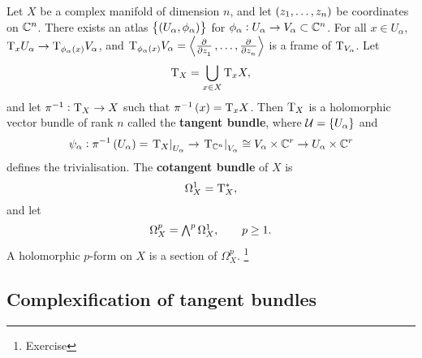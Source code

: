 \pagebreak

\begin{example}
Let $ X $ be a complex manifold of dimension $ n $, and let $ \br{z_1, \dots, z_n} $ be coordinates on $ \mathbb{C}^n $. There exists an atlas $ \cbr{\br{U_\alpha, \phi_\alpha}} $ for $ \phi_\alpha : U_\alpha \to V_\alpha \subset \mathbb{C}^n $. For all $ x \in U_\alpha $, $ \T_xU_\alpha \to \T_{\phi_\alpha\br{x}}V_\alpha $, and $ \T_{\phi_\alpha\br{x}}V_\alpha = \abr{\tpd{}{z_1}, \dots, \tpd{}{z_n}} $ is a frame of $ \mathrm{T}_{V_\alpha} $. Let
$$ \mathrm{T}_X = \bigcup_{x \in X} \mathrm{T}_xX, $$
and let $ \pi^{-1} : \mathrm{T}_X \to X $ such that $ \pi^{-1}\br{x} = \T_xX $. Then $ \mathrm{T}_X $ is a holomorphic vector bundle of rank $ n $ called the \textbf{tangent bundle}, where $ \UUU = \cbr{U_\alpha} $ and
$$ \psi_\alpha : \pi^{-1}\br{U_\alpha} = \eval{\T_X}_{U_\alpha} \to \eval{\T_{\CC^n}}_{V_\alpha} \cong V_\alpha \times \CC^r \to U_\alpha \times \CC^r $$
defines the trivialisation. The \textbf{cotangent bundle} of $ X $ is
$$ \Omega_X^1 = \mathrm{T}_X^*, $$
and let
$$ \Omega_X^p = \textstyle\bigwedge^p\Omega_X^1, \qquad p \ge 1. $$
A holomorphic $ p $-form on $ X $ is a section of $ \Omega_X^p $. \footnote{Exercise}
\end{example}

\subsection{Complexification of tangent bundles}


